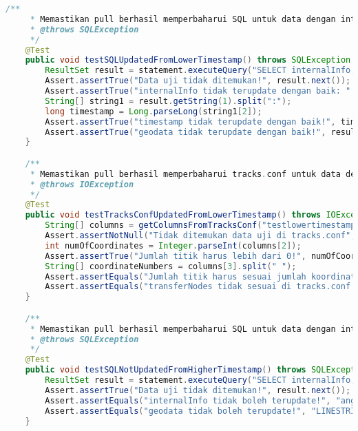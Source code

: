 \begin{lstlisting}[language=Java,basicstyle=\tiny,caption=DataPullerTest.java]
    /**
     * Memastikan pull berhasil memperbaharui SQL untuk data dengan internalInfo berisi 'angkotwebid:nnn:mmm' (dengan timestamp tetapi lebih rendah)
     * @throws SQLException
     */
    @Test
    public void testSQLUpdatedFromLowerTimestamp() throws SQLException {
        ResultSet result = statement.executeQuery("SELECT internalInfo, AsText(geodata) FROM tracks WHERE trackId='testlowertimestamp';");
        Assert.assertTrue("Data uji tidak ditemukan!", result.next());
        Assert.assertTrue("internalInfo tidak terupdate dengan baik: " + result.getString(1), result.getString(1).matches("angkotwebid:641:[0-9]+"));
        String[] string1 = result.getString(1).split(":");
        long timestamp = Long.parseLong(string1[2]);
        Assert.assertTrue("timestamp tidak terupdate dengan baik!", timestamp > 808628400);
        Assert.assertTrue("geodata tidak terupdate dengan baik!", result.getString(2).matches("LINESTRING(.+)"));
    }

    /**
     * Memastikan pull berhasil memperbaharui tracks.conf untuk data dengan internalInfo berisi 'angkotwebid:nnn:mmm' (dengan timestamp tetapi lebih rendah)
     * @throws IOException
     */
    @Test
    public void testTracksConfUpdatedFromLowerTimestamp() throws IOException {
        String[] columns = getColumnsFromTracksConf("testlowertimestamp");
        Assert.assertNotNull("Tidak ditemukan data uji di tracks.conf", columns);
        int numOfCoordinates = Integer.parseInt(columns[2]);
        Assert.assertTrue("Jumlah titik harus lebih dari 0!", numOfCoordinates > 0);
        String[] coordinateNumbers = columns[3].split(" ");
        Assert.assertEquals("Jumlah titik harus sesuai jumlah koordinat", numOfCoordinates * 2, coordinateNumbers.length);
        Assert.assertEquals("transferNodes tidak sesuai di tracks.conf!", "0-" + (numOfCoordinates - 1), columns[5]);
    }

    /**
     * Memastikan pull berhasil memperbaharui SQL untuk data dengan internalInfo berisi 'angkotwebid:nnn:mmm' (dengan timestamp tetapi lebih tinggi)
     * @throws SQLException
     */
    @Test
    public void testSQLNotUpdatedFromHigherTimestamp() throws SQLException {
        ResultSet result = statement.executeQuery("SELECT internalInfo, AsText(geodata) FROM tracks WHERE trackId='testhighertimestamp';");
        Assert.assertTrue("Data uji tidak ditemukan!", result.next());
        Assert.assertEquals("internalInfo tidak boleh terupdate!", "angkotwebid:109:2386551600", result.getString(1));
        Assert.assertEquals("geodata tidak boleh terupdate!", "LINESTRING(107.6038 -6.91082)", result.getString(2));
    }


\end{lstlisting}
